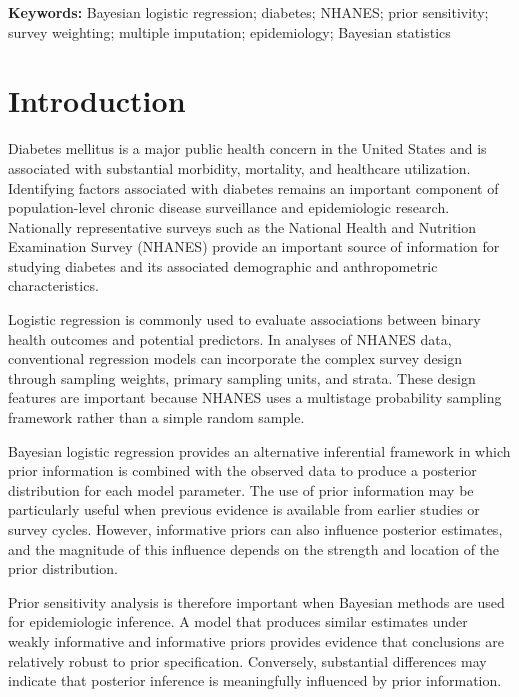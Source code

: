 \documentclass[12pt]{article}
\begin{document}

\noindent
\textbf{Keywords:}
Bayesian logistic regression; diabetes; NHANES; prior sensitivity; survey weighting; multiple imputation; epidemiology; Bayesian statistics


\section{Introduction}

Diabetes mellitus is a major public health concern in the United States and is associated with substantial morbidity, mortality, and healthcare utilization. Identifying factors associated with diabetes remains an important component of population-level chronic disease surveillance and epidemiologic research. Nationally representative surveys such as the National Health and Nutrition Examination Survey (NHANES) provide an important source of information for studying diabetes and its associated demographic and anthropometric characteristics.

Logistic regression is commonly used to evaluate associations between binary health outcomes and potential predictors. In analyses of NHANES data, conventional regression models can incorporate the complex survey design through sampling weights, primary sampling units, and strata. These design features are important because NHANES uses a multistage probability sampling framework rather than a simple random sample.

Bayesian logistic regression provides an alternative inferential framework in which prior information is combined with the observed data to produce a posterior distribution for each model parameter. The use of prior information may be particularly useful when previous evidence is available from earlier studies or survey cycles. However, informative priors can also influence posterior estimates, and the magnitude of this influence depends on the strength and location of the prior distribution.

Prior sensitivity analysis is therefore important when Bayesian methods are used for epidemiologic inference. A model that produces similar estimates under weakly informative and informative priors provides evidence that conclusions are relatively robust to prior specification. Conversely, substantial differences may indicate that posterior inference is meaningfully influenced by prior information.
\end{document}
